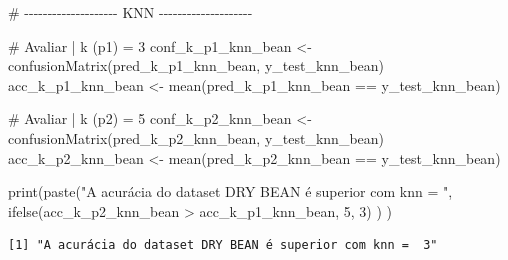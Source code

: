 \documentclass[
  letterpaper,
  DIV=11,
  numbers=noendperiod]{scrartcl}
\newenvironment{Shaded}{\begin{snugshade}}{\end{snugshade}}
\newcommand{\CommentTok}[1]{\textcolor[rgb]{0.37,0.37,0.37}{#1}}
\newcommand{\DecValTok}[1]{\textcolor[rgb]{0.68,0.00,0.00}{#1}}
\newcommand{\FunctionTok}[1]{\textcolor[rgb]{0.28,0.35,0.67}{#1}}
\newcommand{\NormalTok}[1]{\textcolor[rgb]{0.00,0.23,0.31}{#1}}
\newcommand{\OtherTok}[1]{\textcolor[rgb]{0.00,0.23,0.31}{#1}}
\newcommand{\SpecialCharTok}[1]{\textcolor[rgb]{0.37,0.37,0.37}{#1}}
\newcommand{\StringTok}[1]{\textcolor[rgb]{0.13,0.47,0.30}{#1}}
\begin{document}
\begin{Shaded}
\begin{Highlighting}[]
\CommentTok{\# {-}{-}{-}{-}{-}{-}{-}{-}{-}{-}{-}{-}{-}{-}{-}{-}{-}{-}{-}{-} KNN {-}{-}{-}{-}{-}{-}{-}{-}{-}{-}{-}{-}{-}{-}{-}{-}{-}{-}{-}{-}}

\CommentTok{\# Avaliar | k (p1) = 3}
\NormalTok{conf\_k\_p1\_knn\_bean }\OtherTok{\textless{}{-}} \FunctionTok{confusionMatrix}\NormalTok{(pred\_k\_p1\_knn\_bean, y\_test\_knn\_bean)}
\NormalTok{acc\_k\_p1\_knn\_bean  }\OtherTok{\textless{}{-}} \FunctionTok{mean}\NormalTok{(pred\_k\_p1\_knn\_bean }\SpecialCharTok{==}\NormalTok{ y\_test\_knn\_bean)}

\CommentTok{\# Avaliar | k (p2) = 5}
\NormalTok{conf\_k\_p2\_knn\_bean  }\OtherTok{\textless{}{-}} \FunctionTok{confusionMatrix}\NormalTok{(pred\_k\_p2\_knn\_bean, y\_test\_knn\_bean)}
\NormalTok{acc\_k\_p2\_knn\_bean   }\OtherTok{\textless{}{-}} \FunctionTok{mean}\NormalTok{(pred\_k\_p2\_knn\_bean }\SpecialCharTok{==}\NormalTok{ y\_test\_knn\_bean)}

\FunctionTok{print}\NormalTok{(}\FunctionTok{paste}\NormalTok{(}\StringTok{"A acurácia do dataset DRY BEAN é superior com knn = "}\NormalTok{, }
            \FunctionTok{ifelse}\NormalTok{(acc\_k\_p2\_knn\_bean }\SpecialCharTok{\textgreater{}}\NormalTok{ acc\_k\_p1\_knn\_bean, }\DecValTok{5}\NormalTok{, }\DecValTok{3}\NormalTok{)}
\NormalTok{            )}
\NormalTok{      )}
\end{Highlighting}
\end{Shaded}

\begin{verbatim}
[1] "A acurácia do dataset DRY BEAN é superior com knn =  3"
\end{verbatim}
\end{document}
